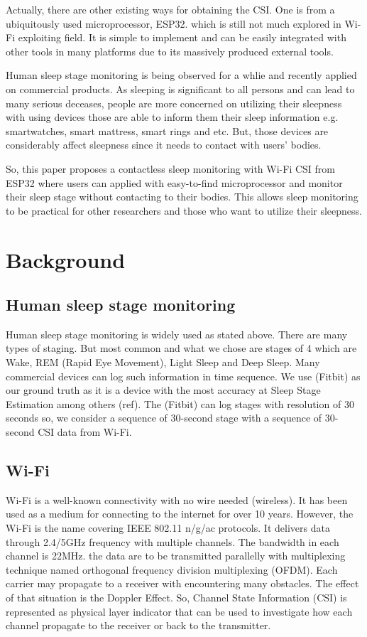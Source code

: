 \documentclass[10pt,letterpaper]{article}
\begin{document}
	Actually, there are other existing ways for obtaining the CSI. One is from a ubiquitously used microprocessor, ESP32. which is still not much explored in Wi-Fi exploiting field. It is simple to implement and can be easily integrated with other tools in many platforms due to its massively produced external tools. 
	
	
	Human sleep stage monitoring is being observed for a whlie and recently applied on commercial products. As sleeping is significant to all persons and can lead to many serious deceases, people are more concerned on utilizing their sleepness with using devices those are able to inform them their sleep information e.g. smartwatches, smart mattress, smart rings and etc.
	But, those devices are considerably affect sleepness since it needs to contact with users' bodies. 

	So, this paper proposes a contactless sleep monitoring with Wi-Fi CSI from ESP32 where users can applied with easy-to-find microprocessor and monitor their sleep stage without contacting to their bodies.
	This allows sleep monitoring to be practical for other researchers and those who want to utilize their sleepness.
	


	\section*{Background}
	
	\subsection*{Human sleep stage monitoring}
	Human sleep stage monitoring is widely used as stated above. There are many types of staging. But most common and what we chose are stages of 4 which are Wake, REM (Rapid Eye Movement),  Light Sleep and Deep Sleep. Many commercial devices can log such information in time sequence. We use {(Fitbit)} as our ground truth as it is a device with the most accuracy at Sleep Stage Estimation among others (ref). The {(Fitbit)}  can log stages with resolution of 30 seconds so, we consider a sequence of 30-second stage with a sequence of 30-second CSI data from Wi-Fi.
	
	
	\subsection*{Wi-Fi}\label{wifi}
	
	Wi-Fi is a well-known connectivity with no wire needed (wireless). It has been used as a medium for connecting to the internet for over 10 years. However, the Wi-Fi is the name covering IEEE 802.11 n/g/ac protocols. It delivers data through 2.4/5GHz frequency with multiple channels. The bandwidth in each channel is 22MHz. the data are to be transmitted  parallelly with multiplexing technique named orthogonal frequency division multiplexing (OFDM). Each carrier may propagate to a receiver with encountering many obstacles. The effect of that situation is the Doppler Effect.
	So, Channel State Information (CSI) is represented as physical layer indicator that can be used to investigate how each channel propagate to the receiver or back to the transmitter.
	
\end{document}
